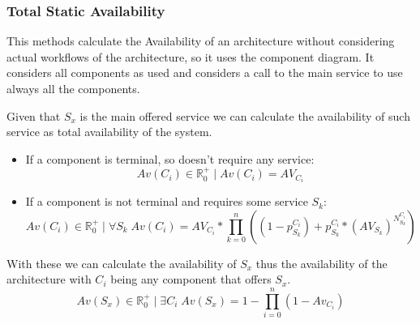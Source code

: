 \subsubsection{Total Static Availability}
This methods calculate the Availability of an architecture without considering actual workflows of the architecture, so it uses the component diagram. It considers all components as used and considers a call to the main service to use always all the components.

Given that $S_x$ is the main offered service we can calculate the availability of such service as total availability of the system.
\begin{itemize}
\item If a component is terminal, so doesn't require any service:
\[ Av(C_{i}) \in \mathbb{R}^+_0 \; | \; Av(C_{i}) = AV_{C_{i}} \]
\item  If a component is not terminal and requires some service $S_k$:
\[ Av(C_{i}) \in \mathbb{R}^+_0 \; | \; \forall S_k \; Av(C_{i}) = AV_{C_{i}}*\prod_{k=0}^{n} ((1-p_{S_k}^{C_{i}}) + p_{S_k}^{C_{i}} * (AV_{S_k})^{N_{S_k}^{C_i}}) \]
\end{itemize}
With these we can calculate the availability of $S_x$ thus the availability of the architecture with $C_i$ being any component that offers $S_x$.
\[ Av(S_x) \in \mathbb{R}^+_0 \; | \; \exists C_i \; Av(S_x) = 1-\prod_{i=0}^{n}(1-Av_{C_i}) \]
